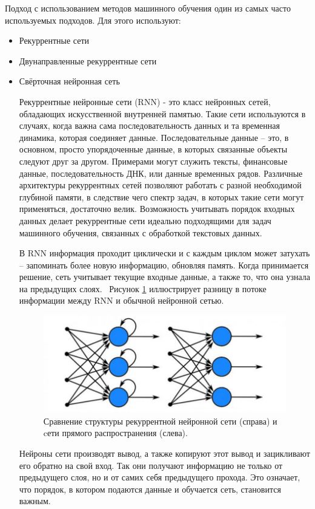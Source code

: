 Подход с использованием методов машинного обучения один из самых часто используемых подходов. 
Для этого используют: 
\begin{itemize}
  \item Рекуррентные сети
  \item Двунаправленные рекуррентные сети
  \item Свёрточная нейронная сеть
\begin{itemize}

Рекуррентные нейронные сети (RNN) - это класс нейронных сетей, обладающих искусственной внутренней памятью. 
Такие сети используются в случаях, когда важна сама последовательность данных и та временная динамика, которая соединяет данные. 
Последовательные данные – это, в основном, просто упорядоченные данные, в которых связанные объекты следуют друг за другом. 
Примерами могут служить тексты, финансовые данные, последовательность ДНК, или данные временных рядов. Различные архитектуры 
рекуррентных сетей позволяют работать с разной необходимой глубиной памяти, в следствие чего спектр задач, в которых такие сети 
могут применяться, достаточно велик. Возможность учитывать порядок входных данных делает рекуррентные сети идеально подходящими 
для задач машинного обучения, связанных с обработкой текстовых данных.

В RNN информация проходит циклически и с каждым циклом может затухать – запоминать более новую информацию, обновляя память. 
Когда принимается решение, сеть учитывает текущие входные данные, а также то, что она узнала на предыдущих слоях. \
Рисунок \ref{pic:recur} иллюстрирует разницу в потоке информации между RNN и обычной нейронной сетью.

\begin{figure}[h]
\includegraphics[width=0.75\columnwidth]{./img/recur.jpg}
\centering
\caption{Сравнение структуры рекуррентной нейронной сети (справа) и cети прямого распространения (слева). \cite{recur}}
\label{pic:recur}
\end{figure}

Нейроны сети производят вывод, а также копируют этот вывод и зацикливают его обратно на свой вход.
Так они получают информацию не только от предыдущего слоя, но и от самих себя предыдущего прохода. 
Это означает, что порядок, в котором подаются данные и обучается сеть, становится важным.


\end{itemize}
\end{itemize}
